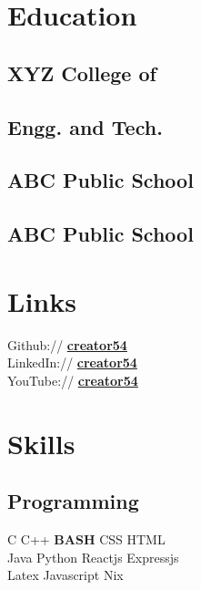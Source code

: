 \documentclass[]{deedy-resume-openfont}
\begin{document}
\begin{minipage}[t]{0.32\textwidth} 


\section{Education} 

\subsection{XYZ College of}
\subsection{Engg. and Tech.}
\sectionsep

\subsection{ABC Public School}
\sectionsep

\subsection{ABC Public School}
\sectionsep


\section{Links} 
Github:// \href{https://github.com/creator54}{\bf creator54} \\
LinkedIn:// \href{https://www.linkedin.com/in/creator54}{\bf creator54} \\
YouTube:// \href{https://www.youtube.com/user/creator54}{\bf creator54} \\


\section{Skills}
\subsection{Programming}
\textbullet{}C \textbullet{} C++ \textbullet{} \textbf{BASH} \textbullet{} CSS \textbullet{} HTML \\
 \textbullet{} Java \textbullet{} Python \textbullet{} Reactjs \textbullet{} Expressjs \\
 \textbullet{} Latex \textbullet{} Javascript \textbullet{} Nix
\sectionsep


\end{minipage}
\end{document}
